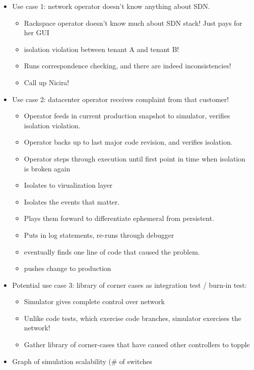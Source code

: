 \begin{itemize}
\item Use case 1: network operator doesn't know anything about SDN.
    \begin{itemize}
    \item Rackspace operator doesn’t know much about SDN stack! Just pays for
    her GUI
    \item isolation violation between tenant A and tenant B!
    \item Runs correspondence checking, and there are indeed inconsistencies!
    \item Call up Nicira!
    \end{itemize}
\item Use case 2: datacenter operator receives complaint from that customer!
    \begin{itemize}
    \item Operator feeds in current production snapshot to simulator, verifies
    isolation violation.
    \item Operator backs up to last major code revision, and verifies 
    isolation.
    \item Operator steps through execution until first point in time when
    isolation is broken again
    \item Isolates to virualization layer
    \item Isolates the events that matter.
    \item Plays them forward to differentiate ephemeral from persistent.
    \item Puts in log statements, re-runs through debugger
    \item eventually finds one line of code that caused the problem.
    \item pushes change to production
    \end{itemize}
\item Potential use case 3: library of corner cases as integration test /
burn-in test:
    \begin{itemize}
    \item Simulator gives complete control over network
    \item Unlike code tests, which exercise code branches, simulator exercises
    the network!
    \item Gather library of corner-cases that have caused other controllers to
    topple
    \end{itemize}
\item {} Graph of simulation scalability (\# of switches

\end{itemize}
